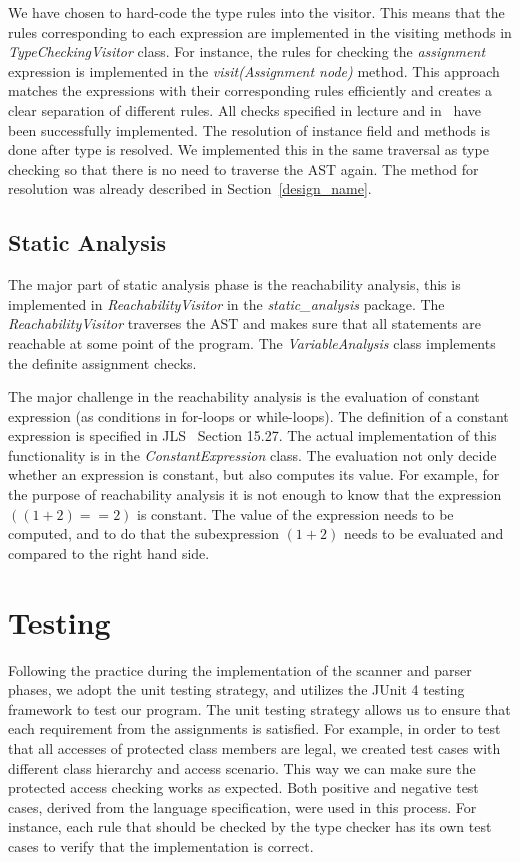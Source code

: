 \documentclass[a4paper, notitlepage]{report}
\begin{document}
We have chosen to hard-code the type rules into the visitor. This means that the rules corresponding to each expression are implemented in the visiting methods in \emph{TypeCheckingVisitor} class. For instance, the rules for checking the \emph{assignment} expression is implemented in the \emph{visit(Assignment node)} method. This approach matches the expressions with their corresponding rules efficiently and creates a clear separation of different rules. All checks specified in lecture and in~\cite{a3} have been successfully implemented. The resolution of instance field and methods is done after type is resolved. We implemented this in the same traversal as type checking so that there is no need to traverse the AST again. The method for resolution was already described in Section~\ref{design_name}.

\section{Static Analysis}

The major part of static analysis phase is the reachability analysis, this is implemented in \emph{ReachabilityVisitor} in the \emph{static\_analysis} package. The \emph{ReachabilityVisitor} traverses the AST and makes sure that all statements are reachable at some point of the program. The \emph{VariableAnalysis} class  implements the definite assignment checks.

The major challenge in the reachability analysis is the evaluation of constant expression (as conditions in for-loops or while-loops). The definition of a constant expression is specified in JLS~\cite{gosling2000java} Section 15.27. The actual implementation of this functionality is in the \emph{ConstantExpression} class. The evaluation not only decide whether an expression is constant, but also computes its value. For example, for the purpose of reachability analysis it is not enough to know that the expression $((1+2) == 2)$  is constant. The value of the expression needs to be computed, and to do that the subexpression $(1+2)$ needs to be evaluated and compared to the right hand side.

%

\chapter{Testing}
\label{testing}
Following the practice during the implementation of the scanner and parser phases, we adopt the unit testing strategy, and utilizes the JUnit 4 testing framework to test our program. The unit testing strategy allows us to ensure that each requirement from the assignments is satisfied. For example, in order to test that all accesses of protected class members are legal, we created test cases with different class hierarchy and access scenario. This way we can make sure the protected access checking works as expected. Both positive and negative test cases, derived from the language specification, were used in this process. For instance, each rule that should be checked by the type checker has its own test cases to verify that the implementation is correct.
\end{document}
